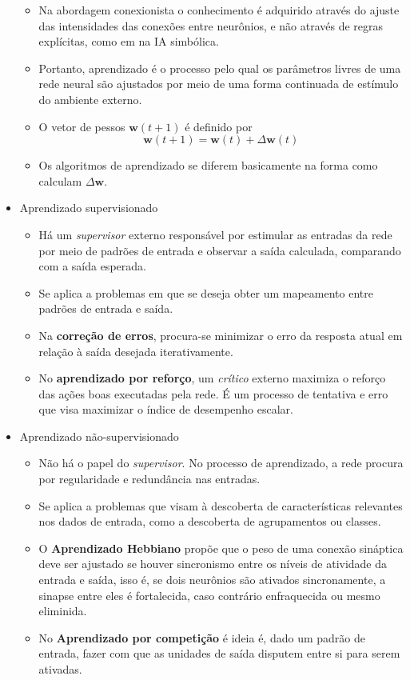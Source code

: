 \documentclass{article}
\begin{document}
\begin{itemize}
	\begin{itemize}
		\item Na abordagem conexionista o conhecimento é adquirido através do ajuste das intensidades das conexões entre neurônios, e não através de regras explícitas, como em na IA simbólica.
		\item Portanto, aprendizado é o processo pelo qual os parâmetros livres de uma rede neural são ajustados por meio de uma forma continuada de estímulo do ambiente externo.
		\item O vetor de pessos $\mathbf{w}(t+1)$ é definido por 
		$$\mathbf{w}(t+1) = \mathbf{w}(t) + \Delta\mathbf{w}(t)$$
		\item Os algoritmos de aprendizado se diferem basicamente na forma como calculam $\Delta\mathbf{w}$.
	\end{itemize}

	\item Aprendizado supervisionado

	\begin{itemize}
		\item Há um \emph{supervisor} externo responsável por estimular as entradas da rede por meio de padrões de entrada e observar a saída calculada, comparando com a saída esperada.
		\item Se aplica a problemas em que se deseja obter um mapeamento entre padrões de entrada e saída.
		\item Na \textbf{correção de erros}, procura-se minimizar o erro da resposta atual em relação à saída desejada iterativamente.
		\item No \textbf{aprendizado por reforço}, um \emph{crítico} externo maximiza o reforço das ações boas executadas pela rede. É um processo de tentativa e erro que visa maximizar o índice de desempenho escalar.
	\end{itemize}

	\item Aprendizado não-supervisionado

	\begin{itemize}
		\item Não há o papel do \emph{supervisor}. No processo de aprendizado, a rede procura por regularidade e redundância nas entradas.
		\item Se aplica a problemas que visam à descoberta de características relevantes nos dados de entrada, como a descoberta de agrupamentos ou classes.
		\item O \textbf{Aprendizado Hebbiano} propõe que o peso de uma conexão sináptica deve ser ajustado se houver sincronismo entre os níveis de atividade da entrada e saída, isso é, se dois neurônios são ativados sincronamente, a sinapse entre eles é fortalecida, caso contrário enfraquecida ou mesmo eliminida.
		\item No \textbf{Aprendizado por competição} é ideia é, dado um padrão de entrada, fazer com que as unidades de saída disputem entre si para serem ativadas. 
	\end{itemize}


\end{itemize}
\end{document}
